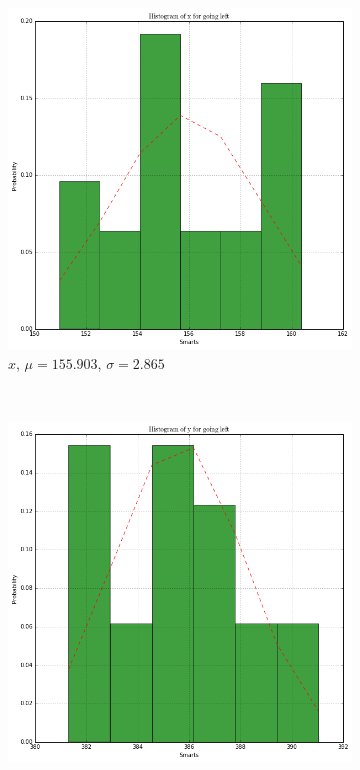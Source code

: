 \documentclass[paper=a4, fontsize=11pt]{scrartcl} %
\begin{document}
\begin{figure}[h!]
    \centering
    \begin{subfigure}[b]{0.3\textwidth}
        \setlength{\fboxsep}{0.5pt} %
        \setlength{\fboxrule}{0.5pt}
        \includegraphics[width=\textwidth,fbox]{images/histogram_4_x_left.png}
        \caption{$x$, $\mu = 155.903$, $\sigma = 2.865$}
    \end{subfigure}
    ~
    \begin{subfigure}[b]{0.3\textwidth}
        \setlength{\fboxsep}{0.5pt} %
        \setlength{\fboxrule}{0.5pt}
        \includegraphics[width=\textwidth,fbox]{images/histogram_4_y_left.png}

\end{subfigure}
\end{figure}
\end{document}
